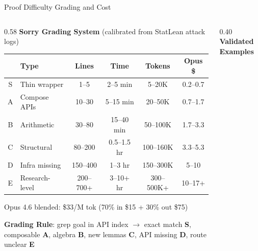 \documentclass[aspectratio=169, 10pt]{beamer}
\begin{document}
\begin{frame}{Proof Difficulty Grading and Cost}

\begin{columns}[T]
\begin{column}{0.58\textwidth}
\textbf{Sorry Grading System} (calibrated from StatLean attack logs)

\vspace{0.2em}
{\scriptsize
\begin{tabular}{clcccc}
  \toprule
  & \textbf{Type} & \textbf{Lines} & \textbf{Time} & \textbf{Tokens} & \textbf{Opus \$} \\
  \midrule
  S & Thin wrapper    & 1--5    & 2--5 min   & 5--20K    & 0.2--0.7 \\
  A & Compose APIs    & 10--30  & 5--15 min  & 20--50K   & 0.7--1.7 \\
  B & Arithmetic      & 30--80  & 15--40 min & 50--100K  & 1.7--3.3 \\
  C & Structural      & 80--200 & 0.5--1.5 hr & 100--160K & 3.3--5.3 \\
  D & Infra missing   & 150--400 & 1--3 hr   & 150--300K & 5--10 \\
  E & Research-level  & 200--700+ & 3--10+ hr & 300--500K+ & 10--17+ \\
  \bottomrule
\end{tabular}
}

{\scriptsize Opus 4.6 blended: \$33/M tok (70\% in \$15 + 30\% out \$75)}

\vspace{0.3em}
\textbf{Grading Rule}: grep goal in API index $\to$
exact match \textbf{S}, composable \textbf{A}, algebra \textbf{B},
new lemmas \textbf{C}, API missing \textbf{D}, route unclear \textbf{E}
\end{column}
\begin{column}{0.40\textwidth}
\textbf{Validated Examples}


\end{column}
\end{columns}
\end{frame}
\end{document}
